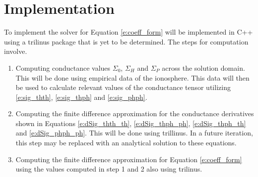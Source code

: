 \documentclass{article}
\begin{document}
\section{Implementation}
To implement the solver for Equation \ref{e:coeff_form} will be implemented in C++ using a trilinus package that is yet to be determined. The steps for computation involve.  
\begin{enumerate}
    \item Computing conductance values $\Sigma_0$, $\Sigma_H$ and $\Sigma_P$ across the solution domain. This will be done using empirical data of the ionosphere. This data will then be used to calculate relevant values of the conductance tensor utilizing \ref{e:sig_thth}, \ref{e:sig_thph} and \ref{e:sig_phph}.
    \item Computing the finite difference approximation for the conductance derivatives shown in Equations \ref{e:dSig_thth_th}, \ref{e:dSig_thph_ph}, \ref{e:dSig_thph_th} and \ref{e:dSig_phph_ph}. This will be done using trillinus. In a future iteration, this step may be replaced with an analytical solution to these equations.
    \item Computing the finite difference approximation for Equation \ref{e:coeff_form} using the values computed in step 1 and 2 also using trilinus.
\end{enumerate}
\end{document}

